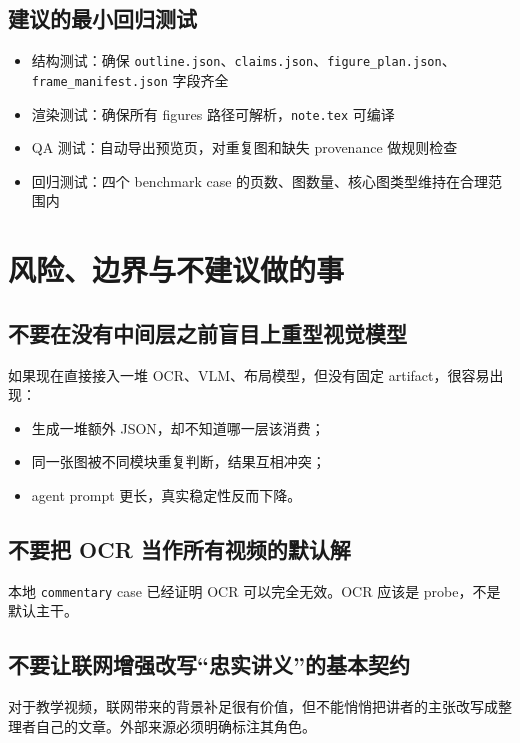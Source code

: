 \documentclass[a4paper]{article}
\begin{document}
\subsection{建议的最小回归测试}

\begin{itemize}
\item 结构测试：确保 \texttt{outline.json}、\texttt{claims.json}、\texttt{figure\_plan.json}、\texttt{frame\_manifest.json} 字段齐全
\item 渲染测试：确保所有 figures 路径可解析，\texttt{note.tex} 可编译
\item QA 测试：自动导出预览页，对重复图和缺失 provenance 做规则检查
\item 回归测试：四个 benchmark case 的页数、图数量、核心图类型维持在合理范围内
\end{itemize}

\section{风险、边界与不建议做的事}

\subsection{不要在没有中间层之前盲目上重型视觉模型}

如果现在直接接入一堆 OCR、VLM、布局模型，但没有固定 artifact，很容易出现：

\begin{itemize}
\item 生成一堆额外 JSON，却不知道哪一层该消费；
\item 同一张图被不同模块重复判断，结果互相冲突；
\item agent prompt 更长，真实稳定性反而下降。
\end{itemize}

\subsection{不要把 OCR 当作所有视频的默认解}

本地 \texttt{commentary} case 已经证明 OCR 可以完全无效。OCR 应该是 probe，不是默认主干。

\subsection{不要让联网增强改写“忠实讲义”的基本契约}

对于教学视频，联网带来的背景补足很有价值，但不能悄悄把讲者的主张改写成整理者自己的文章。外部来源必须明确标注其角色。
\end{document}

